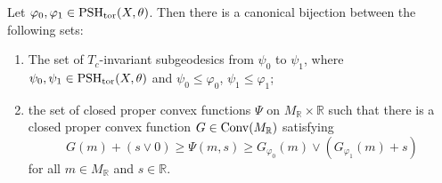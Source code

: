 \begin{corollary}\label{cor:geodG}
    Let $\varphi_0,\varphi_1\in \mathrm{PSH}_{\mathrm{tor}}(X,\theta)$. Then there is a canonical bijection between the following sets:
    \begin{enumerate}
        \item\label{itm:cor:geodG:1} The set of $T_c$-invariant subgeodesics from $\psi_0$ to $\psi_1$, where $\psi_0,\psi_1\in \mathrm{PSH}_{\mathrm{tor}}(X,\theta)$ and $\psi_0\leq \varphi_0$, $\psi_1\leq \varphi_1$;
        \item\label{itm:cor:geodG:2} the set of closed proper convex functions $\Psi$ on $M_{\mathbb{R}}\times \mathbb{R}$ such that there is a closed proper convex function $G\in \mathrm{Conv}(M_{\mathbb{R}})$ satisfying
        \begin{equation}\label{eq:Psilower}
        G(m)+(s\lor 0)\geq \Psi(m,s)\geq G_{\varphi_0}(m)\lor \left( G_{\varphi_1}(m)+s \right)
        \end{equation}
        for all $m\in M_{\mathbb{R}}$ and $s\in \mathbb{R}$.
    \end{enumerate}
\end{corollary}

